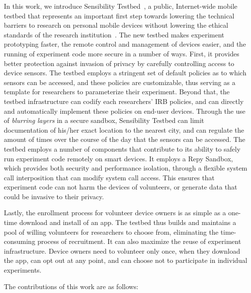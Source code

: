 In this work, we introduce Sensibility Testbed~\cite{sensibility,
zhuang2015privacy}, a public,
Internet-wide mobile testbed that represents an important first step
towards lowering the technical barriers to research on personal mobile
devices without lowering the
ethical standards of the research
institution~\cite{zevenbergen2013ethical}.
The new testbed makes experiment prototyping faster, the remote
control and management of devices easier, and the running of
experiment code more secure in a number of ways. First, it provides
better protection against invasion of privacy by carefully controlling
access to device sensors. The testbed employs a stringent set of
default policies as to which sensors can be accessed, and these
policies are customizable, thus serving as a template for researchers
to parameterize their experiment. Beyond that, the testbed
infrastructure can codify each researchers' IRB policies, and can
directly and automatically implement these policies on end-user
devices. Through the use of \textit{blurring layers} in a secure
sandbox, Sensibility Testbed can limit documentation of his/her exact
location to the nearest city, and can regulate the amount of times
over the course of the day that the sensors can be accessed. The
testbed employs a number of components that contribute to its ability
to safely run experiment code remotely on smart devices. It employs a
Repy Sandbox, which provides both security and performance isolation,
through a flexible system call interposition that can modify system
call access. This ensures that experiment code can not harm the
devices of volunteers, or generate data that could be invasive to
their privacy.

Lastly, the enrollment process for volunteer device owners is as
simple as a one-time download and install of an app. The testbed thus
builds and maintains a pool of willing volunteers for researchers to
choose from, eliminating the time-consuming process of recruitment. It
can also maximize the reuse of experiment infrastructure. Device
owners need to volunteer only once, when they download the app, can
opt out at any point, and can choose not to participate in individual
experiments.

The contributions of this work are as follows:

